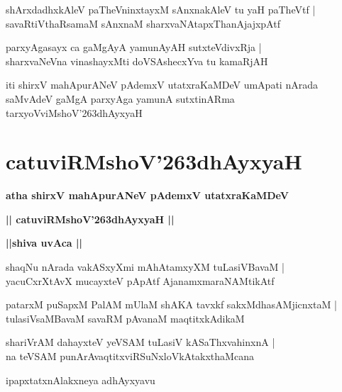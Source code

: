 \documentclass[twoside,12pt,openright]{book}
\def\S{\char'263}
\newcounter{shloka}[chapter]
\def\uvaca#1{\centerline{{\large\textbf{#1}}}}
\begin{document}
\begin{shloka}%
shArxdadhxkAleV paTheVninxtayxM sAnxnakAleV tu yaH paTheVtf |\\
savaRtiVthaRsamaM sAnxnaM sharxvaNAtapxThanAjajxpAtf
\end{shloka}

\begin{shloka}%
parxyAgasayx ca gaMgAyA yamunAyAH sutxteVdivxRja |\\
sharxvaNeVna vinashayxMti doVSAshecxYva tu kamaRjAH
\end{shloka}

\begin{center}
iti shirxV mahApurANeV pAdemxV utatxraKaMDeV  umApati nArada saMvAdeV  
gaMgA parxyAga yamunA sutxtinARma tarxyoVviMshoV\S dhAyxyaH 
\end{center}

\chapter{catuviRMshoV\S dhAyxyaH}

\begin{center}
{\LARGE\bfseries atha shirxV mahApurANeV pAdemxV utatxraKaMDeV} 
\end{center}

\begin{center}
{\LARGE\bfseries  || catuviRMshoV\S dhAyxyaH ||}
\end{center}

\uvaca{||shiva uvAca ||}

\begin{shloka}%
shaqNu nArada vakASxyXmi mAhAtamxyXM tuLasiVBavaM |\\
yacuCxrXtAvX mucayxteV pApAtf AjanamxmaraNAMtikAtf
\end{shloka}

\begin{shloka}%
patarxM puSapxM PalAM mUlaM shAKA tavxkf sakxMdhasAMjicnxtaM |\\
tulasiVsaMBavaM savaRM pAvanaM maqtitxkAdikaM 
\end{shloka}

\begin{shloka}%
shariVrAM dahayxteV yeVSAM tuLasiV kASaThxvahinxnA |\\
na teVSAM punArAvaqtitxviRSuNxloVkAtakxthaMcana
\end{shloka}

\begin{center}
ipapxtatxnAlakxneya adhAyxyavu
\end{center}
\end{document}
